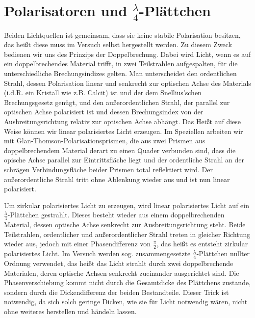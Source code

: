 \documentclass[bigchapter,colorback,accentcolor=tud4b,linedtoc,11pt]{tudreport}
\begin{document}
\section{Polarisatoren und $\frac{\lambda}{4}$-Plättchen}
Beiden Lichtquellen ist gemeinsam, dass sie keine stabile Polarisation besitzen, das heißt diese muss im Versuch selbst hergestellt werden. Zu diesem Zweck bedienen wir uns des Prinzips der Doppelbrechung. Dabei wird Licht, wenn es auf ein doppelbrechendes Material trifft, in zwei Teilstrahlen aufgespalten, für die unterschiedliche Brechungsindizes gelten. Man unterscheidet den ordentlichen Strahl, dessen Polarisation linear und senkrecht zur optischen Achse des Materials (i.d.R. ein Kristall wie z.B. Calcit) ist und der dem Snellius'schen Brechungsgesetz genügt, und den außerordentlichen Strahl, der parallel zur optischen Achse polarisiert ist und dessen Brechungsindex von der Ausbreitungsrichtung relativ zur optischen Achse abhängt. Das Heißt auf diese Weise können wir linear polarisiertes Licht erzeugen. Im Speziellen arbeiten wir mit Glan-Thomson-Polarisationsprismen, die aus zwei Prismen aus doppelbrechendem Material derart zu einen Quader verbunden sind, dass die opische Achse parallel zur Eintrittsfläche liegt und der ordentliche Strahl an der schrägen Verbindungsfläche beider Prismen total reflektiert wird. Der außerordentliche Strahl tritt ohne Ablenkung wieder aus und ist nun linear polarisiert.

\vspace{\baselineskip}Um zirkular polarisiertes Licht zu erzeugen, wird linear polarisiertes Licht auf ein $\frac{\lambda}{4}$-Plättchen gestrahlt. Dieses besteht wieder aus einem doppelbrechenden Material, dessen optische Achse senkrecht zur Ausbreitungsrichtung steht. Beide Teilstrahlen, ordentlicher und außerordentlicher Strahl treten in gleicher Richtung wieder aus, jedoch mit einer Phasendifferenz von $\frac{\pi}{2}$, das heißt es entsteht zirkular polarisiertes Licht. Im Versuch werden sog. zusammengesetzte $\frac{\lambda}{4}$-Plättchen nullter Ordnung verwendet, das heißt das Licht strahlt durch zwei doppelbrechende Materialen, deren optische Achsen senkrecht zueinander ausgerichtet sind. Die Phasenverschiebung kommt nicht durch die Gesamtdicke des Plättchens zustande, sondern durch die Dickendifferenz der beiden Bestandteile. Dieser Trick ist notwendig, da sich solch geringe Dicken, wie sie für Licht notwendig wären, nicht ohne weiteres herstellen und händeln lassen.

\end{document}
